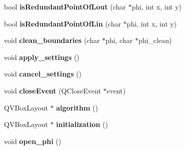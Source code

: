 \begin{DoxyCompactItemize}
\item 
\hypertarget{classofeli_1_1_image_viewer_a86075561ed658cec8e6352504f9195a8}{bool {\bfseries is\-Redundant\-Point\-Of\-Lout} (char $\ast$phi, int x, int y)}\label{classofeli_1_1_image_viewer_a86075561ed658cec8e6352504f9195a8}

\item 
\hypertarget{classofeli_1_1_image_viewer_ab4d24263fa3d9153b1104d6e45af8644}{bool {\bfseries is\-Redundant\-Point\-Of\-Lin} (char $\ast$phi, int x, int y)}\label{classofeli_1_1_image_viewer_ab4d24263fa3d9153b1104d6e45af8644}

\item 
\hypertarget{classofeli_1_1_image_viewer_a409969890163dc452ce2222a9e2dde8b}{void {\bfseries clean\-\_\-boundaries} (char $\ast$phi, char $\ast$phi\-\_\-clean)}\label{classofeli_1_1_image_viewer_a409969890163dc452ce2222a9e2dde8b}

\item 
\hypertarget{classofeli_1_1_image_viewer_aa6ee122637da193506c7afb0168b05e1}{void {\bfseries apply\-\_\-settings} ()}\label{classofeli_1_1_image_viewer_aa6ee122637da193506c7afb0168b05e1}

\item 
\hypertarget{classofeli_1_1_image_viewer_a2909d2c541e831ecc315648af5728058}{void {\bfseries cancel\-\_\-settings} ()}\label{classofeli_1_1_image_viewer_a2909d2c541e831ecc315648af5728058}

\item 
\hypertarget{classofeli_1_1_image_viewer_a4cb52d7220fc196558cee8618cb78d1d}{void {\bfseries close\-Event} (Q\-Close\-Event $\ast$event)}\label{classofeli_1_1_image_viewer_a4cb52d7220fc196558cee8618cb78d1d}

\item 
\hypertarget{classofeli_1_1_image_viewer_a11968ebe10eacaf7520b8251df85d227}{Q\-V\-Box\-Layout $\ast$ {\bfseries algorithm} ()}\label{classofeli_1_1_image_viewer_a11968ebe10eacaf7520b8251df85d227}

\item 
\hypertarget{classofeli_1_1_image_viewer_a84c2a8dfef07cca5b4a2318ebe8d5e77}{Q\-V\-Box\-Layout $\ast$ {\bfseries initialization} ()}\label{classofeli_1_1_image_viewer_a84c2a8dfef07cca5b4a2318ebe8d5e77}

\item 
\hypertarget{classofeli_1_1_image_viewer_a7a31b66ad7cd2e8d42bbf4b2225ed396}{void {\bfseries open\-\_\-phi} ()}\label{classofeli_1_1_image_viewer_a7a31b66ad7cd2e8d42bbf4b2225ed396}


\end{DoxyCompactItemize}
